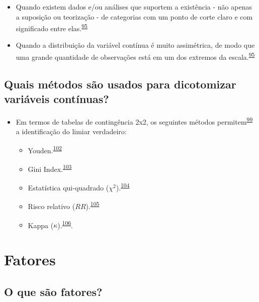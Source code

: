 \documentclass[
  a4paper,
]{book}
\begin{document}
\begin{itemize}
\item
  Quando existem dados e/ou análises que suportem a existência - não apenas a suposição ou teorização - de categorias com um ponto de corte claro e com significado entre elas.\textsuperscript{\protect\hyperlink{ref-MacCallum2002}{95}}
\item
  Quando a distribuição da variável contínua é muito assimétrica, de modo que uma grande quantidade de observações está em um dos extremos da escala.\textsuperscript{\protect\hyperlink{ref-MacCallum2002}{95}}
\end{itemize}

\hypertarget{quais-muxe9todos-suxe3o-usados-para-dicotomizar-variuxe1veis-contuxednuas}{%
\subsection{Quais métodos são usados para dicotomizar variáveis contínuas?}\label{quais-muxe9todos-suxe3o-usados-para-dicotomizar-variuxe1veis-contuxednuas}}

\begin{itemize}
\item
  Em termos de tabelas de contingência 2x2, os seguintes métodos permitem\textsuperscript{\protect\hyperlink{ref-Prince2017}{99}} a identificação do limiar verdadeiro:

  \begin{itemize}
  \item
    Youden.\textsuperscript{\protect\hyperlink{ref-YOUDEN1950}{102}}
  \item
    Gini Index.\textsuperscript{\protect\hyperlink{ref-strobl2007}{103}}
  \item
    Estatística qui-quadrado (\(\chi^2\)).\textsuperscript{\protect\hyperlink{ref-pearson1900}{104}}
  \item
    Risco relativo (\(RR\)).\textsuperscript{\protect\hyperlink{ref-Greiner2000}{105}}
  \item
    Kappa (\(\kappa\)).\textsuperscript{\protect\hyperlink{ref-fleiss1971}{106}}.
  \end{itemize}
\end{itemize}

\hypertarget{fatores}{%
\section{Fatores}\label{fatores}}

\hypertarget{o-que-suxe3o-fatores}{%
\subsection{O que são fatores?}\label{o-que-suxe3o-fatores}}
\end{document}
